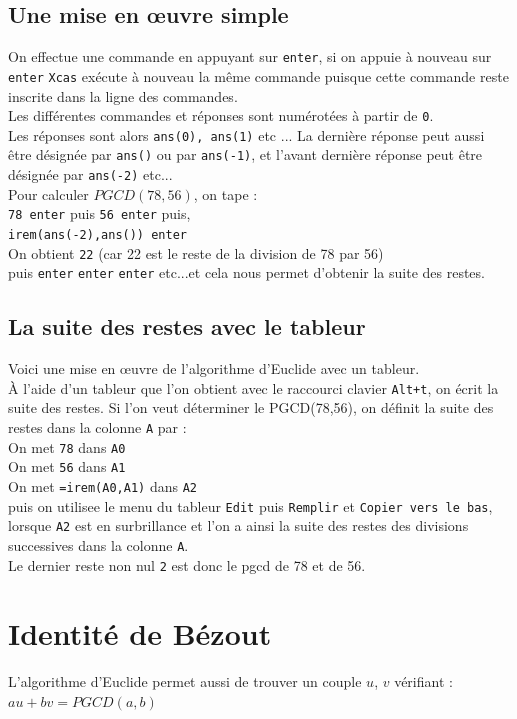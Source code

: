\documentclass[a4paper,11pt]{book}
\begin{document}
\subsection{Une mise en \oe uvre simple}
On effectue une commande en appuyant sur {\tt enter}, si on 
appuie \`a nouveau sur {\tt enter} {\tt Xcas} ex\'ecute \`a nouveau la 
m\^eme commande puisque cette commande reste inscrite dans la ligne des
commandes.\\
Les diff\'erentes commandes et r\'eponses sont num\'erot\'ees \`a partir de 
{\tt 0}.\\ 
Les r\'eponses sont alors {\tt ans(0), ans(1)} etc ... La 
derni\`ere r\'eponse peut aussi \^etre d\'esign\'ee par {\tt ans()} ou 
par {\tt ans(-1)}, et l'avant derni\`ere r\'eponse peut \^etre d\'esign\'ee par {\tt ans(-2)} etc...\\
 Pour calculer  $PGCD(78,56)$, on tape :\\
{\tt 78 enter} puis {\tt 56 enter} puis,\\
{\tt irem(ans(-2),ans()) enter}\\ 
On obtient {\tt 22} (car 22 est le reste de la division de 78 par 56)\\
puis {\tt enter} {\tt enter} {\tt enter} etc...et cela nous permet d'obtenir la suite des restes.
\subsection{La suite des restes avec le tableur}
 Voici une mise en \oe uvre de l'algorithme d'Euclide avec un tableur.\\
\`A l'aide d'un tableur que l'on obtient avec le raccourci clavier {\tt Alt+t},
on \'ecrit la suite des restes.
Si l'on veut d\'eterminer le PGCD(78,56), on d\'efinit la suite des restes dans 
la colonne {\tt A} par :\\
On met {\tt 78} dans {\tt A0}\\
On met {\tt 56} dans {\tt A1}\\
On met {\tt=irem(A0,A1)} dans {\tt A2}\\
puis on utilisee le menu du tableur {\tt Edit} puis {\tt Remplir} et 
{\tt Copier vers le bas}, lorsque {\tt A2} est en surbrillance et l'on a ainsi 
la suite des restes des divisions successives dans la colonne {\tt A}.\\
Le dernier reste non nul {\tt 2} est donc le pgcd de 78 et de 56.
\section{Identit\'e de B\'ezout}
L'algorithme d'Euclide permet aussi de trouver un couple $u$, $v$ v\'erifiant :\\
$ au + bv= PGCD(a,b) $
\end{document}
